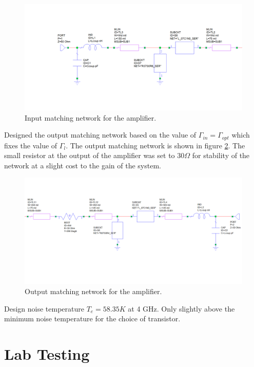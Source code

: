 \documentclass[twocolumn, aps, floatfix]{revtex4-1}
\begin{document}
    \begin{figure}[!htbp]
    \centering
    \includegraphics[scale=0.35]{input_net.png}
    \caption{Input matching network for the amplifier.}
    \label{fig:inputnet}
    \end{figure}

Designed the output matching network based on the value of $\Gamma_{in} = \Gamma_{opt}$ which fixes the value of $\Gamma_l$. The output matching network is shown in figure \ref{fig:outputnet}. The small resistor at the output of the amplifier was set to $30 \Omega$ for stability of the network at a slight cost to the gain of the system.

    \begin{figure}[!htbp]
    \centering
    \includegraphics[scale=0.35]{output_net.png}
    \caption{Output matching network for the amplifier.}
    \label{fig:outputnet}
    \end{figure}

Design noise temperature $T_e = 58.35 K$ at 4 GHz. Only slightly above the minimum noise temperature for the choice of transistor.

\FloatBarrier

\section*{Lab Testing}
\end{document}

